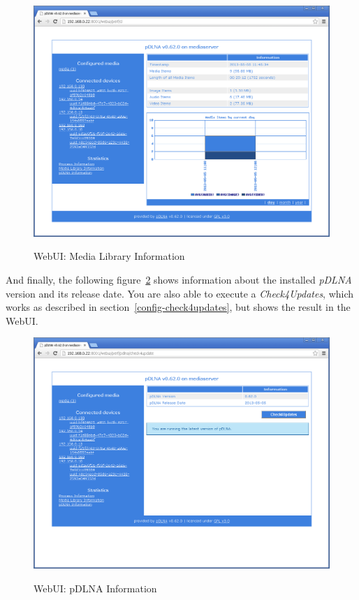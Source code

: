 \documentclass[a4paper,oneside,10pt]{report}
\begin{document}
\begin{figure}
	\centering
		\includegraphics[width=34em]{images/webui_stats_library}
	\label{fig:webgui-library}
	\caption{WebUI: Media Library Information}
\end{figure}

And finally, the following figure~\ref{fig:webgui-pdlna} shows information about the installed {\em pDLNA} version and its release date. You are also able to execute a {\em Check4Updates}, which works as described in section~\ref{config-check4updates}, but shows the result in the WebUI.

\begin{figure}
	\centering
		\includegraphics[width=34em]{images/webui_stats_pdlna}
	\label{fig:webgui-pdlna}
	\caption{WebUI: pDLNA Information}
\end{figure}
\end{document}
